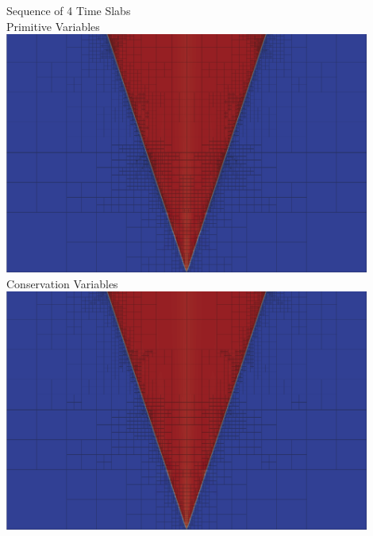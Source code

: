 \documentclass[18pt,xcolor=table]{beamer}
\begin{document}
\begin{frame}[t]
\begin{columns}[t]
\hspace{8ex}
\begin{column}[T]{0.4\textwidth} %
\centering
\textcolor{utblack}{Sequence of 4 Time Slabs}\\
Primitive Variables\\
\vspace{1ex}
\includegraphics[width=0.9\textwidth]{Noh/FormulationComparison/Form0Mesh8.png}\\
Conservation Variables\\
\vspace{1ex}
\includegraphics[width=0.9\textwidth]{Noh/FormulationComparison/Form1Mesh8.png}\\
\end{column}
\end{columns}

\end{frame}
\end{document}
